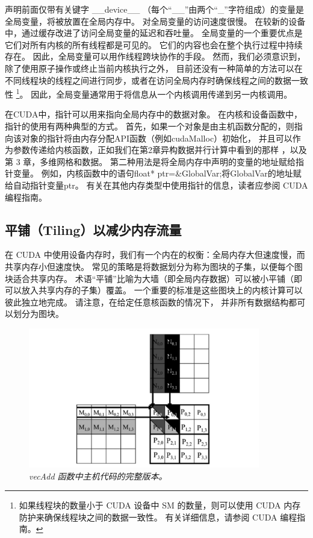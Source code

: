 声明前面仅带有关键字 \_\_device\_\_ （每个“\_\_”由两个“\_”字符组成）的变量是全局变量，将被放置在全局内存中。 
对全局变量的访问速度很慢。 在较新的设备中，通过缓存改进了访问全局变量的延迟和吞吐量。 
全局变量的一个重要优点是它们对所有内核的所有线程都是可见的。 它们的内容也会在整个执行过程中持续存在。 
因此，全局变量可以用作线程跨块协作的手段。 然而，我们必须意识到，除了使用原子操作或终止当前内核执行之外，
目前还没有一种简单的方法可以在不同线程块的线程之间进行同步，或者在访问全局内存时确保线程之间的数据一致性
\footnote{如果线程块的数量小于 CUDA 设备中 SM 的数量，则可以使用 CUDA 内存防护来确保线程块之间的数据一致性。 
有关详细信息，请参阅 CUDA 编程指南。}。 
因此，全局变量通常用于将信息从一个内核调用传递到另一内核调用。

在CUDA中，指针可以用来指向全局内存中的数据对象。 在内核和设备函数中，指针的使用有两种典型的方式。 
首先，如果一个对象是由主机函数分配的，则指向该对象的指针将由内存分配API函数（例如cudaMalloc）初始化，
并且可以作为参数传递给内核函数，正如我们在第2章异构数据并行计算中看到的那样 ，以及第 3 章，多维网格和数据。 
第二种用法是将全局内存中声明的变量的地址赋给指针变量。 
例如，内核函数中的语句{float* ptr=\&GlobalVar;}将GlobalVar的地址赋给自动指针变量ptr。 
有关在其他内存类型中使用指针的信息，读者应参阅 CUDA 编程指南。

\subsection{平铺（Tiling）以减少内存流量}
在 CUDA 中使用设备内存时，我们有一个内在的权衡：全局内存大但速度慢，而共享内存小但速度快。 
常见的策略是将数据划分为称为图块的子集，以便每个图块适合共享内存。 
术语“平铺”比喻为大墙（即全局内存数据）可以被小平铺（即可以放入共享内存的子集）覆盖。 
一个重要的标准是这些图块上的内核计算可以彼此独立地完成。 请注意，在给定任意核函数的情况下，
并非所有数据结构都可以划分为图块。

\begin{figure}[H]
	\centering
	\includegraphics[width=0.9\textwidth]{figs/F5.5.png}
	\caption{\textit{\color{red} vecAdd 函数中主机代码的完整版本。}}
\end{figure}

